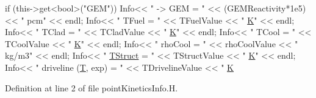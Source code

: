 \begin{DoxyCode}
\textcolor{stringliteral}{if (this->get<bool>("}GEM\textcolor{stringliteral}{"))}
\textcolor{stringliteral}{    Info<< "}    -> GEM            = \textcolor{stringliteral}{" << (GEMReactivity*1e5) << "} pcm\textcolor{stringliteral}{" << endl;}
\textcolor{stringliteral}{Info<< "}    TFuel = \textcolor{stringliteral}{" << TFuelValue << "} \hyperlink{EEqn__1pl_8H_a0bf7c6d3f8200774cfd62534a837b61d}{K}\textcolor{stringliteral}{" << endl;}
\textcolor{stringliteral}{Info<< "}    TClad = \textcolor{stringliteral}{" << TCladValue << "} \hyperlink{EEqn__1pl_8H_a0bf7c6d3f8200774cfd62534a837b61d}{K}\textcolor{stringliteral}{" << endl;}
\textcolor{stringliteral}{Info<< "}    TCool = \textcolor{stringliteral}{" << TCoolValue << "} \hyperlink{EEqn__1pl_8H_a0bf7c6d3f8200774cfd62534a837b61d}{K}\textcolor{stringliteral}{" << endl;}
\textcolor{stringliteral}{Info<< "}    rhoCool = \textcolor{stringliteral}{" << rhoCoolValue << "} kg/m3\textcolor{stringliteral}{" << endl;}
\textcolor{stringliteral}{Info<< "}    \hyperlink{createCouplingFields_8H_aff59c849e5a7c616f1bc0bb46332f5a3}{TStruct} = \textcolor{stringliteral}{" << TStructValue << "} \hyperlink{EEqn__1pl_8H_a0bf7c6d3f8200774cfd62534a837b61d}{K}\textcolor{stringliteral}{" << endl;}
\textcolor{stringliteral}{Info<< "}    driveline (\hyperlink{EEqn__1p_8H_ad0f94aa7ea43d4be0bae24e3a89aad0c}{T}, exp) = \textcolor{stringliteral}{"}
\textcolor{stringliteral}{    << TDrivelineValue << "} \hyperlink{EEqn__1pl_8H_a0bf7c6d3f8200774cfd62534a837b61d}{K}
\end{DoxyCode}


Definition at line 2 of file point\+Kinetics\+Info.\+H.

